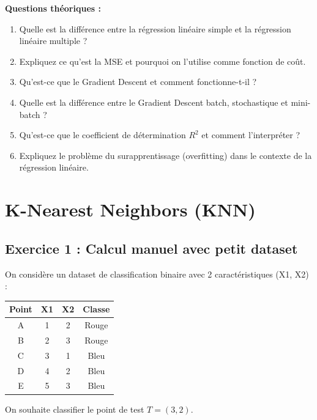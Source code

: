 \documentclass[11pt,a4paper]{article}
\begin{document}
\begin{questionbox}
\textbf{Questions théoriques :}
\begin{enumerate}
    \item Quelle est la différence entre la régression linéaire simple et la régression linéaire multiple ?
    
    \item Expliquez ce qu'est la MSE et pourquoi on l'utilise comme fonction de coût.
    
    \item Qu'est-ce que le Gradient Descent et comment fonctionne-t-il ?
    
    \item Quelle est la différence entre le Gradient Descent batch, stochastique et mini-batch ?
    
    \item Qu'est-ce que le coefficient de détermination $R^2$ et comment l'interpréter ?
    
    \item Expliquez le problème du surapprentissage (overfitting) dans le contexte de la régression linéaire.
\end{enumerate}
\end{questionbox}

\newpage


\section{K-Nearest Neighbors (KNN)}

\subsection{Exercice 1 : Calcul manuel avec petit dataset}

\begin{databox}
On considère un dataset de classification binaire avec 2 caractéristiques (X1, X2) :

\begin{center}
\begin{tabular}{|c|c|c|c|}
\hline
\textbf{Point} & \textbf{X1} & \textbf{X2} & \textbf{Classe} \\
\hline
A & 1 & 2 & Rouge \\
B & 2 & 3 & Rouge \\
C & 3 & 1 & Bleu \\
D & 4 & 2 & Bleu \\
E & 5 & 3 & Bleu \\
\hline
\end{tabular}
\end{center}

On souhaite classifier le point de test $T = (3, 2)$.
\end{databox}
\end{document}
